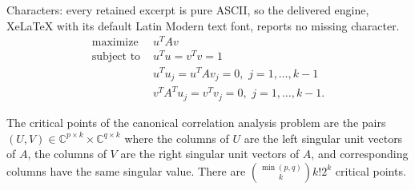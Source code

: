 \documentclass[10pt,a4paper]{amsart}
\newcommand{\CC}{\mathbb{C}}
\begin{document}
Characters: every retained excerpt is pure ASCII, so the delivered engine, XeLaTeX with its default Latin Modern text font, reports no missing character.
\begin{align}\label{eqn:ccabrokendown}
    \textrm{maximize } &u^T A v\\\nonumber
    \textrm{subject to } &u^Tu = v^Tv = 1\\\nonumber
    &u^Tu_j = u^TAv_j = 0, \,\, j=1, \ldots, k-1\\\nonumber
    &v^TA^Tu_j = v^Tv_j = 0,  \,\, j =1, \ldots, k-1.
\end{align}

\begin{theorem} \label{thm:canonical}
The critical points of the canonical correlation analysis problem are the pairs $(U, V) \in \CC^{p \times k} \times \CC^{q \times k}$
where the columns of $U$ are the left singular unit vectors of $A$, the columns of $V$ are the right singular unit vectors of $A$, and  corresponding columns have the same singular value.
There are $\binom{\min(p, q)}{k} k! 2^k $ critical points.
\end{theorem}
\end{document}
